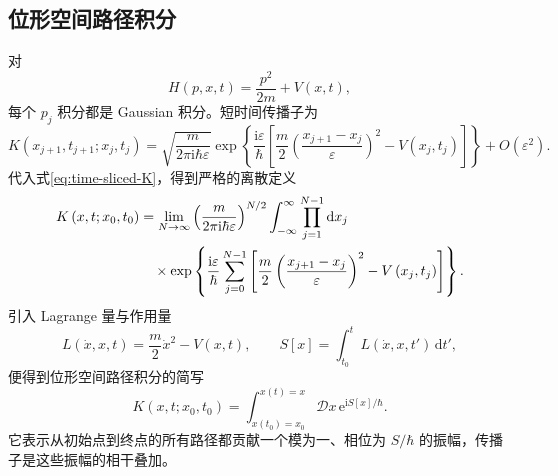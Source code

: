 \subsection{位形空间路径积分}
对
\begin{equation}
H\left(p,x,t\right)=\frac{p^2}{2m}+V\left(x,t\right),
\end{equation}
每个 $p_j$ 积分都是 Gaussian 积分。短时间传播子为
\begin{equation}
K\left(x_{j+1},t_{j+1};x_j,t_j\right)
=\sqrt{\frac{m}{2\pi\mathrm{i}\hbar\varepsilon}}
\exp\left\{\frac{\mathrm{i}\varepsilon}{\hbar}
\left[\frac{m}{2}\left(\frac{x_{j+1}-x_j}{\varepsilon}\right)^2
-V\left(x_j,t_j\right)\right]\right\}+O\left(\varepsilon^2\right).
\label{eq:short-time-kernel}
\end{equation}
代入式\eqref{eq:time-sliced-K}，得到严格的离散定义
\begin{align}
K\left(x,t;x_0,t_0\right)
&=\lim_{N\to\infty}
\left(\frac{m}{2\pi\mathrm{i}\hbar\varepsilon}\right)^{N/2}
\int_{-\infty}^{\infty}\prod_{j=1}^{N-1}\mathrm{d}x_j\notag\\
&\quad\times
\exp\left\{\frac{\mathrm{i}\varepsilon}{\hbar}\sum_{j=0}^{N-1}
\left[\frac{m}{2}\left(\frac{x_{j+1}-x_j}{\varepsilon}\right)^2
-V\left(x_j,t_j\right)\right]\right\}.
\label{eq:configuration-discrete}
\end{align}
引入 Lagrange 量与作用量
\begin{equation}
L\left(\dot x,x,t\right)=\frac{m}{2}\dot x^2-V\left(x,t\right),
\qquad
S\left[x\right]=\int_{t_0}^{t}L\left(\dot x,x,t'\right)\,\mathrm{d}t',
\end{equation}
便得到位形空间路径积分的简写
\begin{equation}
\boxed{K\left(x,t;x_0,t_0\right)=
\int_{x\left(t_0\right)=x_0}^{x\left(t\right)=x}\mathcal D x\,
\mathrm{e}^{\mathrm{i}S\left[x\right]/\hbar}.}
\label{eq:configuration-path-integral}
\end{equation}
它表示从初始点到终点的所有路径都贡献一个模为一、相位为 $S/\hbar$ 的振幅，传播子是这些振幅的相干叠加。

